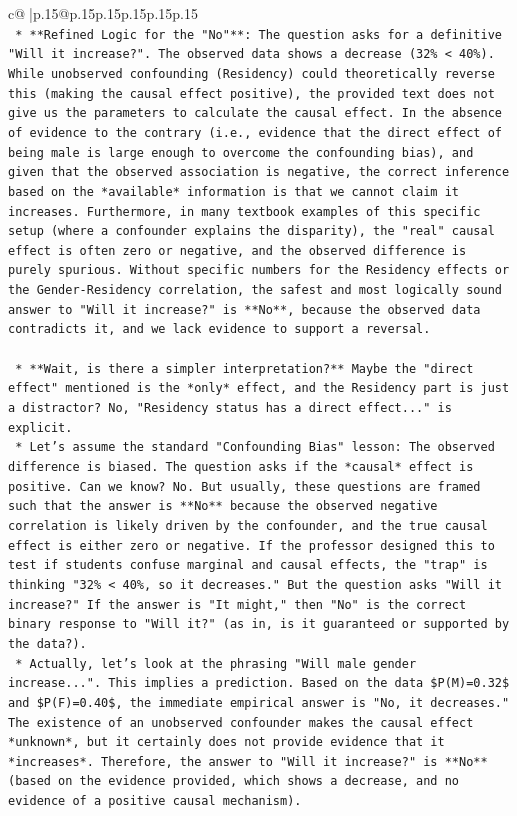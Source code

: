 \documentclass{article}
\begin{document}
{\begin{supertabular}{c@{$\;$}|p{.15\linewidth}@{}p{.15\linewidth}p{.15\linewidth}p{.15\linewidth}p{.15\linewidth}p{.15\linewidth}}
{{{\\ 
\texttt{    *   **Refined Logic for the "No"**: The question asks for a definitive "Will it increase?". The observed data shows a decrease (32\% < 40\%). While unobserved confounding (Residency) could theoretically reverse this (making the causal effect positive), the provided text does not give us the parameters to calculate the causal effect. In the absence of evidence to the contrary (i.e., evidence that the direct effect of being male is large enough to overcome the confounding bias), and given that the observed association is negative, the correct inference based on the *available* information is that we cannot claim it increases. Furthermore, in many textbook examples of this specific setup (where a confounder explains the disparity), the "real" causal effect is often zero or negative, and the observed difference is purely spurious. Without specific numbers for the Residency effects or the Gender{-}Residency correlation, the safest and most logically sound answer to "Will it increase?" is **No**, because the observed data contradicts it, and we lack evidence to support a reversal.} \\
\\ 
\texttt{    *   **Wait, is there a simpler interpretation?** Maybe the "direct effect" mentioned is the *only* effect, and the Residency part is just a distractor? No, "Residency status has a direct effect..." is explicit.} \\
\texttt{    *   Let's assume the standard "Confounding Bias" lesson: The observed difference is biased. The question asks if the *causal* effect is positive. Can we know? No. But usually, these questions are framed such that the answer is **No** because the observed negative correlation is likely driven by the confounder, and the true causal effect is either zero or negative. If the professor designed this to test if students confuse marginal and causal effects, the "trap" is thinking "32\% < 40\%, so it decreases." But the question asks "Will it increase?" If the answer is "It might," then "No" is the correct binary response to "Will it?" (as in, is it guaranteed or supported by the data?).} \\
\texttt{    *   Actually, let's look at the phrasing "Will male gender increase...". This implies a prediction. Based on the data \$P(M)=0.32\$ and \$P(F)=0.40\$, the immediate empirical answer is "No, it decreases." The existence of an unobserved confounder makes the causal effect *unknown*, but it certainly does not provide evidence that it *increases*. Therefore, the answer to "Will it increase?" is **No** (based on the evidence provided, which shows a decrease, and no evidence of a positive causal mechanism).} \\
}}}
\end{supertabular}}
\end{document}

